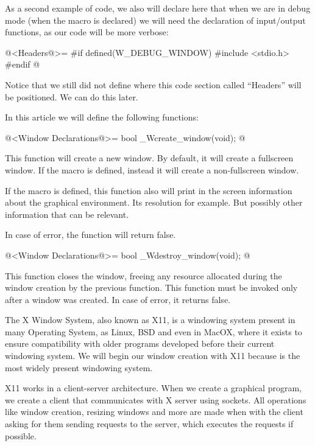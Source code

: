 As a second example of code, we also will declare here that when we
are in debug mode (when the macro  is
declared) we will need the declaration of input/output functions, as
our code will be more verbose:

\iniciocodigo
@<Headers@>=
#if defined(W_DEBUG_WINDOW)
#include <stdio.h>
#endif
@
\fimcodigo

Notice that we still did not define where this code section called
``Headers'' will be positioned. We can do this later.


In this article we will define the following functions:

\iniciocodigo
@<Window Declarations@>=
bool _Wcreate_window(void);
@
\fimcodigo

This function will create a new window. By default, it will create a
fullscreen window. If the macro 
is defined, instead it will create a non-fullscreen window.

If the macro  is defined, this function
also will print in the screen information about the graphical
environment. Its resolution for example. But possibly other
information that can be relevant.

In case of error, the function will return false.

\iniciocodigo
@<Window Declarations@>=
bool _Wdestroy_window(void);
@
\fimcodigo

This function closes the window, freeing any resource allocated during
the window creation by the previous function. This function must be
invoked only after a window was created. In case of error, it returns
false.



The X Window System, also known as X11, is a windowing system present
in many Operating System, as Linux, BSD and even in MacOX, where it
exists to ensure compatibility with older programs developed before
their current windowing system. We will begin our window creation with
X11 because is the most widely present windowing system.

X11 works in a client-server architecture. When we create a graphical
program, we create a client that communicates with X server using
sockets. All operations like window creation, resizing windows and
more are made when with the client asking for them sending requests to
the server, which executes the requests if possible.

